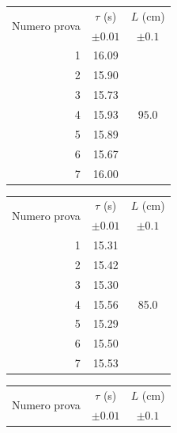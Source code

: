 \documentclass{article}
\begin{document}
\begin{table}[h!]
	\hspace{-0.05\textwidth}
	\begin{minipage}{0.1\textwidth}
		\centering
		\begin{tabular}{ | r | c | c | }
			\hline
			\multirow{2}{5em}{Numero prova}& $ \tau $ (s) & $L$ (cm) \\
			& $\pm 0.01$ & $\pm 0.1$ \\
			\hline
			1 & 16.09 & \multirow{7}{1em}{$95.0$} \\ \cline{1-2}
			2 & 15.90 & \\	\cline{1-2}
			3 & 	15.73 & \\	\cline{1-2}
			4 &	15.93 & \\	\cline{1-2}
			5 &	15.89 & \\	\cline{1-2}
			6 &	15.67 & \\	\cline{1-2}
			7 &	16.00 & \\	\cline{1-2}
			\hline
		\end{tabular}
	\end{minipage}
	\hspace{0.3\textwidth}
	\begin{minipage}{0.1\textwidth}
		\centering
		\begin{tabular}{ | r | c | c | }
    			\hline
    			\multirow{2}{5em}{Numero prova} & $\tau$ (s) & $L$ (cm) \\
    			& $\pm 0.01$ & $\pm 0.1$ \\
    			\hline
    			1 & 15.31 & \multirow{7}{*}{85.0} \\ \cline{1-2}
    			2 & 15.42 & \\ \cline{1-2}
    			3 & 15.30 & \\ \cline{1-2}
    			4 & 15.56 & \\ \cline{1-2}
    			5 & 15.29 & \\ \cline{1-2}
    			6 & 15.50 & \\ \cline{1-2}
    			7 & 15.53 & \\ \cline{1-2}
    			\hline
		\end{tabular}
	\end{minipage}
	\hspace{0.3\textwidth}
	\begin{minipage}{0.1\textwidth}
		\centering
		\begin{tabular}{ | r | c | c | }
    			\hline
    			\multirow{2}{5em}{Numero prova} & $\tau$ (s) & $L$ (cm) \\
    			& $\pm 0.01$ & $\pm 0.1$ \\

\end{tabular}
\end{minipage}
\end{table}
\end{document}
